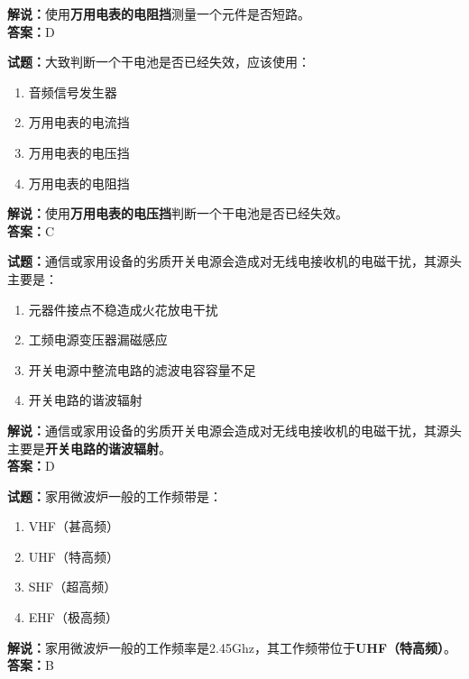 \documentclass{ctexbook}
\begin{document}
\noindent\textbf{解说：}使用\textbf{万用电表的电阻挡}测量一个元件是否短路。\\\noindent\textbf{答案：}D

\bigskip

\noindent\textbf{试题：}大致判断一个干电池是否已经失效，应该使用：

\begin{enumerate}[leftmargin=3em]
  \item 音频信号发生器
  \item 万用电表的电流挡
  \item 万用电表的电压挡
  \item 万用电表的电阻挡
\end{enumerate}

\noindent\textbf{解说：}使用\textbf{万用电表的电压挡}判断一个干电池是否已经失效。\\\noindent\textbf{答案：}C

\bigskip

\noindent\textbf{试题：}通信或家用设备的劣质开关电源会造成对无线电接收机的电磁干扰，其源头主要是：

\begin{enumerate}[leftmargin=3em]
  \item 元器件接点不稳造成火花放电干扰
  \item 工频电源变压器漏磁感应
  \item 开关电源中整流电路的滤波电容容量不足
  \item 开关电路的谐波辐射
\end{enumerate}

\noindent\textbf{解说：}通信或家用设备的劣质开关电源会造成对无线电接收机的电磁干扰，其源头主要是\textbf{开关电路的谐波辐射}。\\\noindent\textbf{答案：}D

\bigskip

\noindent\textbf{试题：}家用微波炉一般的工作频带是：

\begin{enumerate}[leftmargin=3em]
  \item VHF（甚高频）
  \item UHF（特高频）
  \item SHF（超高频）
  \item EHF（极高频）
\end{enumerate}

\noindent\textbf{解说：}家用微波炉一般的工作频率是2.45Ghz，其工作频带位于\textbf{UHF（特高频）}。\\\noindent\textbf{答案：}B
\end{document}
